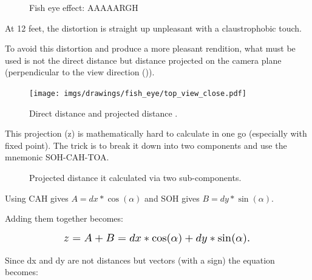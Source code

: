\begin{minipage}{\textwidth}
 \begin{figure}[H]
\centering
 \caption{Fish eye effect: AAAAARGH} \label{fig:mips}
 \end{figure}
 

\begin{minipage}{.4\textwidth}
At 12 feet, the distortion is straight up unpleasant with a claustrophobic touch.\\
\par
To avoid this distortion and produce a more pleasant rendition, what must be used is not the direct distance  but distance projected on the camera plane (perpendicular to the view direction ()).
 \end{minipage}
\begin{minipage}{.6\textwidth}
 \begin{figure}[H]
  \begin{flushright}
  \texttt{[image: imgs/drawings/fish\_eye/top\_view\_close.pdf]}
 \end{flushright}
\end{figure}
 \end{minipage}
\end{minipage}
\par



\begin{figure}[H]

 
\label{fig:Raycasting2}
 \caption{Direct distance  and projected distance .}
\end{figure}

This projection (z) is mathematically hard to calculate in one go (especially with fixed point). The trick is to break it down into two components and use the mnemonic SOH-CAH-TOA.\\


\begin{figure}[H]
\centering
 
 \caption{Projected distance  it calculated via two sub-components.}
\end{figure}
Using CAH gives $A = dx * \cos(\alpha)$ and SOH gives $B = dy * \sin(\alpha) $.\\
\pagebreak

Adding them together becomes:
\par
\begin{figure}[H]
  \centering
  \begin{equation*}
    \scalebox{1.3}{
$z = A + B = dx * \cos(\alpha) + dy * \sin(\alpha) $. 
 }
  \end{equation*}
\end{figure}
Since dx and dy are not distances but vectors (with a sign) the equation becomes: 


